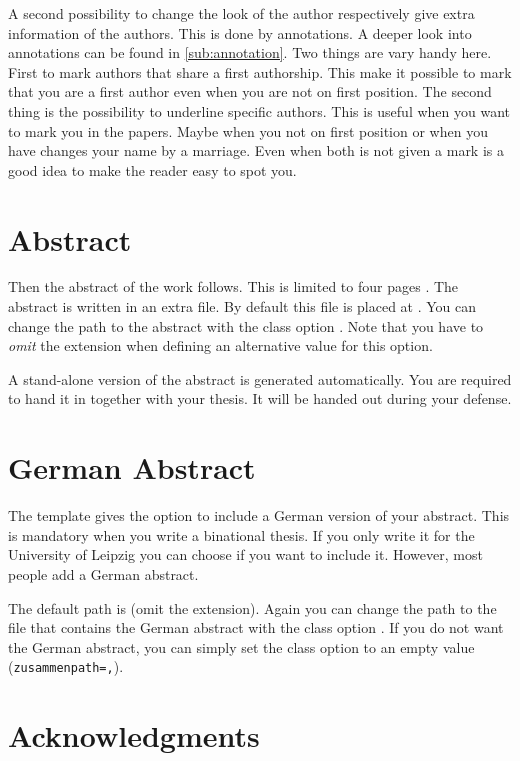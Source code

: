 A second possibility to change the look of the author respectively give extra
information of the authors. This is done by annotations. A deeper look into
annotations can be found in \autoref{sub:annotation}. Two things are vary
handy here. First to mark authors that share a first authorship. This make it
possible to mark that you are a first author even when you are not on first
position. The second thing is the possibility to underline specific authors.
This is useful when you want to mark you in the papers. Maybe when you not on
first position or when you have changes your name by a marriage. Even when
both is not given a mark is a good idea to make the reader easy to spot you.

\section{Abstract}%
\label{opt:abstract}

Then the abstract of the work follows. This is limited to four pages
\citep{web:promotion}. The abstract is written in an extra file. By default
this file is placed at . You can change the
path to the abstract with the class option
. Note that you have to
\emph{omit} the  extension when defining an alternative value for
this option.

A stand-alone version of the abstract is generated automatically. You are
required to hand it in together with your thesis. It will be handed out during
your defense.

\section{German Abstract}%
\label{sec:germanabstract}

The template gives the option to include a German version of your abstract.
This is mandatory when you write a binational thesis. If you only write it for
the University of Leipzig you can choose if you want to include it. However,
most people add a German abstract.

The default path is  (omit the 
extension). Again you can change the path to the file that contains the German
abstract with the class option .
If you do not want the German abstract, you can simply set the class option to
an empty value (\verb!zusammenpath=,!).

\section{Acknowledgments}%
\label{opt:ack}

